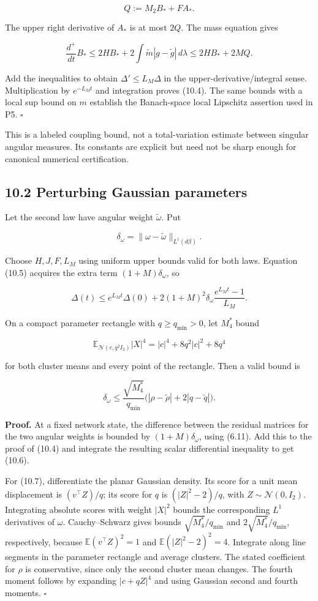 \documentclass[
  10pt,
]{article}
\begin{document}
\[
 Q:=M_2 B_*+F A_*.
\]

The upper right derivative of \(A_*\) is at most \(2Q\). The mass
equation gives

\[
 \frac{d^+}{dt}B_*
 \le2H B_*+2\int\widetilde m|g-\widetilde g|\,d\lambda
 \le2H B_*+2M Q.
\]

Add the inequalities to obtain \(\Delta'\le L_M\Delta\) in the
upper-derivative/integral sense. Multiplication by \(e^{-L_Mt}\) and
integration proves (10.4). The same bounds with a local sup bound on
\(m\) establish the Banach-space local Lipschitz assertion used in P5.
\(\square\)

This is a labeled coupling bound, not a total-variation estimate between
singular angular measures. Its constants are explicit but need not be
sharp enough for canonical numerical certification.

\subsection{10.2 Perturbing Gaussian
parameters}\label{perturbing-gaussian-parameters}

Let the second law have angular weight \(\widetilde\omega\). Put

\[
 \delta_\omega=\|\omega-\widetilde\omega\|_{L^1(d\beta)}.
\]

Choose \(H,J,F,L_M\) using uniform upper bounds valid for both laws.
Equation (10.5) acquires the extra term \((1+M)\delta_\omega\), so

\[
 \Delta(t)\le e^{L_Mt}\Delta(0)
 +2(1+M)^2\delta_\omega\frac{e^{L_Mt}-1}{L_M}.
 \tag{10.6}
\]

On a compact parameter rectangle with \(q\ge q_{\min}>0\), let \(M_4^*\)
bound

\[
 \mathbb E_{\mathcal N(c,q^2I_2)}|X|^4
 =|c|^4+8q^2|c|^2+8q^4
\]

for both cluster means and every point of the rectangle. Then a valid
bound is

\[
 \delta_\omega\le
 \frac{\sqrt{M_4^*}}{q_{\min}}
 \bigl(|\rho-\widetilde\rho|+2|q-\widetilde q|\bigr).
 \tag{10.7}
\]

\textbf{Proof.} At a fixed network state, the difference between the
residual matrices for the two angular weights is bounded by
\((1+M)\delta_\omega\), using (6.11). Add this to the proof of (10.4)
and integrate the resulting scalar differential inequality to get
(10.6).

For (10.7), differentiate the planar Gaussian density. Its score for a
unit mean displacement is \((v^\top Z)/q\); its score for \(q\) is
\((|Z|^2-2)/q\), with \(Z\sim\mathcal N(0,I_2)\). Integrating absolute
scores with weight \(|X|^2\) bounds the corresponding \(L^1\)
derivatives of \(\omega\). Cauchy--Schwarz gives bounds
\(\sqrt{M_4^*}/q_{\min}\) and \(2\sqrt{M_4^*}/q_{\min}\), respectively,
because \(\mathbb E(v^\top Z)^2=1\) and \(\mathbb E(|Z|^2-2)^2=4\).
Integrate along line segments in the parameter rectangle and average
clusters. The stated coefficient for \(\rho\) is conservative, since
only the second cluster mean changes. The fourth moment follows by
expanding \(|c+qZ|^4\) and using Gaussian second and fourth moments.
\(\square\)
\end{document}
